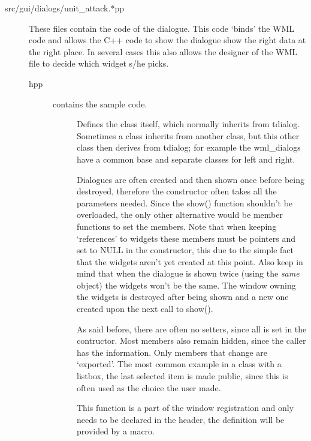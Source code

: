 \begin{description}

\item[src/gui/dialogs/unit\_attack.*pp]
	These files contain the code of the dialogue. This code `binds' the WML
	code and allows the C++ code to show the dialogue show the right data at the
	right place. In several cases this also allows the designer of the WML file
	to decide which widget s/he picks.

\begin{description}
\item[hpp]  contains the sample code.
	\begin{description}
	\item[]
		Defines the class itself, which normally inherits from tdialog.
		Sometimes a class inherits from another class, but this other class then
derives from tdialog; for example the wml\_dialogs have a common base and
separate classes for left and right.

	\item[]
		Dialogues are often created and then shown once before being destroyed,
therefore the constructor often takes all the parameters needed. Since the show()
function shouldn't be overloaded, the only other alternative would be member
functions to set the members. Note that when keeping `references' to widgets these
members must be pointers and set to NULL in the constructor, this due to the
simple fact that the widgets aren't yet created at this point. Also keep in mind that
when the dialogue is shown twice (using the \emph{same} object) the widgets won't be
the same. The window owning the widgets is destroyed after being shown and
a new one created upon the next call to show().

	\item[]
		As said before, there are often no setters, since all is set in the
contructor. Most members also remain hidden, since the caller has the
information. Only members that change are `exported'. The most common example in
a class with a listbox, the last selected item is made public, since this is
often used as the choice the user made.

	\item[]
		This function is a part of the window registration and only needs to be
declared in the header, the definition will be provided by a macro.


\end{description}
\end{description}
\end{description}
